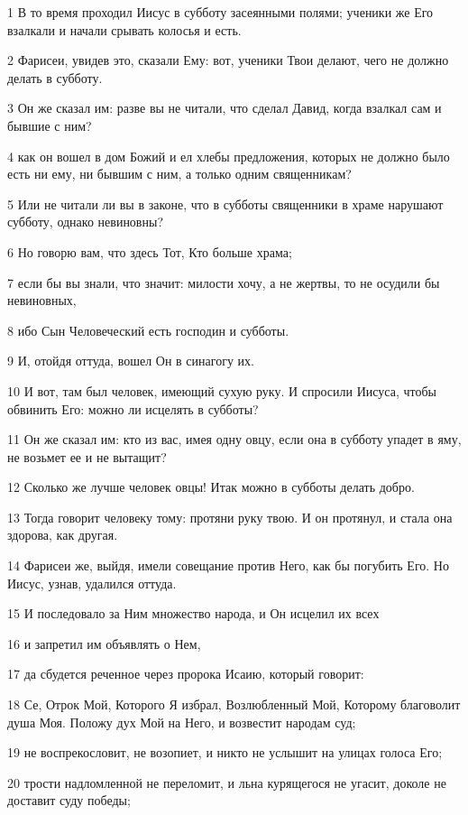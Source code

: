 \par 1 В то время проходил Иисус в субботу засеянными полями; ученики же Его взалкали и начали срывать колосья и есть.
\par 2 Фарисеи, увидев это, сказали Ему: вот, ученики Твои делают, чего не должно делать в субботу.
\par 3 Он же сказал им: разве вы не читали, что сделал Давид, когда взалкал сам и бывшие с ним?
\par 4 как он вошел в дом Божий и ел хлебы предложения, которых не должно было есть ни ему, ни бывшим с ним, а только одним священникам?
\par 5 Или не читали ли вы в законе, что в субботы священники в храме нарушают субботу, однако невиновны?
\par 6 Но говорю вам, что здесь Тот, Кто больше храма;
\par 7 если бы вы знали, что значит: милости хочу, а не жертвы, то не осудили бы невиновных,
\par 8 ибо Сын Человеческий есть господин и субботы.
\par 9 И, отойдя оттуда, вошел Он в синагогу их.
\par 10 И вот, там был человек, имеющий сухую руку. И спросили Иисуса, чтобы обвинить Его: можно ли исцелять в субботы?
\par 11 Он же сказал им: кто из вас, имея одну овцу, если она в субботу упадет в яму, не возьмет ее и не вытащит?
\par 12 Сколько же лучше человек овцы! Итак можно в субботы делать добро.
\par 13 Тогда говорит человеку тому: протяни руку твою. И он протянул, и стала она здорова, как другая.
\par 14 Фарисеи же, выйдя, имели совещание против Него, как бы погубить Его. Но Иисус, узнав, удалился оттуда.
\par 15 И последовало за Ним множество народа, и Он исцелил их всех
\par 16 и запретил им объявлять о Нем,
\par 17 да сбудется реченное через пророка Исаию, который говорит:
\par 18 Се, Отрок Мой, Которого Я избрал, Возлюбленный Мой, Которому благоволит душа Моя. Положу дух Мой на Него, и возвестит народам суд;
\par 19 не воспрекословит, не возопиет, и никто не услышит на улицах голоса Его;
\par 20 трости надломленной не переломит, и льна курящегося не угасит, доколе не доставит суду победы;
